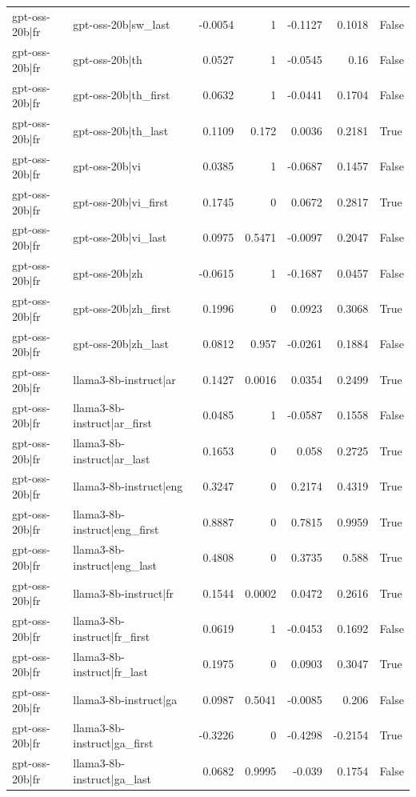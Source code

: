 \begin{table}
\begin{tabular}{l l r r r r l}
gpt-oss-20b|fr & gpt-oss-20b|sw_last & -0.0054 & 1 & -0.1127 & 0.1018 & False \\
gpt-oss-20b|fr & gpt-oss-20b|th & 0.0527 & 1 & -0.0545 & 0.16 & False \\
gpt-oss-20b|fr & gpt-oss-20b|th_first & 0.0632 & 1 & -0.0441 & 0.1704 & False \\
gpt-oss-20b|fr & gpt-oss-20b|th_last & 0.1109 & 0.172 & 0.0036 & 0.2181 & True \\
gpt-oss-20b|fr & gpt-oss-20b|vi & 0.0385 & 1 & -0.0687 & 0.1457 & False \\
gpt-oss-20b|fr & gpt-oss-20b|vi_first & 0.1745 & 0 & 0.0672 & 0.2817 & True \\
gpt-oss-20b|fr & gpt-oss-20b|vi_last & 0.0975 & 0.5471 & -0.0097 & 0.2047 & False \\
gpt-oss-20b|fr & gpt-oss-20b|zh & -0.0615 & 1 & -0.1687 & 0.0457 & False \\
gpt-oss-20b|fr & gpt-oss-20b|zh_first & 0.1996 & 0 & 0.0923 & 0.3068 & True \\
gpt-oss-20b|fr & gpt-oss-20b|zh_last & 0.0812 & 0.957 & -0.0261 & 0.1884 & False \\
gpt-oss-20b|fr & llama3-8b-instruct|ar & 0.1427 & 0.0016 & 0.0354 & 0.2499 & True \\
gpt-oss-20b|fr & llama3-8b-instruct|ar_first & 0.0485 & 1 & -0.0587 & 0.1558 & False \\
gpt-oss-20b|fr & llama3-8b-instruct|ar_last & 0.1653 & 0 & 0.058 & 0.2725 & True \\
gpt-oss-20b|fr & llama3-8b-instruct|eng & 0.3247 & 0 & 0.2174 & 0.4319 & True \\
gpt-oss-20b|fr & llama3-8b-instruct|eng_first & 0.8887 & 0 & 0.7815 & 0.9959 & True \\
gpt-oss-20b|fr & llama3-8b-instruct|eng_last & 0.4808 & 0 & 0.3735 & 0.588 & True \\
gpt-oss-20b|fr & llama3-8b-instruct|fr & 0.1544 & 0.0002 & 0.0472 & 0.2616 & True \\
gpt-oss-20b|fr & llama3-8b-instruct|fr_first & 0.0619 & 1 & -0.0453 & 0.1692 & False \\
gpt-oss-20b|fr & llama3-8b-instruct|fr_last & 0.1975 & 0 & 0.0903 & 0.3047 & True \\
gpt-oss-20b|fr & llama3-8b-instruct|ga & 0.0987 & 0.5041 & -0.0085 & 0.206 & False \\
gpt-oss-20b|fr & llama3-8b-instruct|ga_first & -0.3226 & 0 & -0.4298 & -0.2154 & True \\
gpt-oss-20b|fr & llama3-8b-instruct|ga_last & 0.0682 & 0.9995 & -0.039 & 0.1754 & False \\

\end{tabular}
\end{table}
